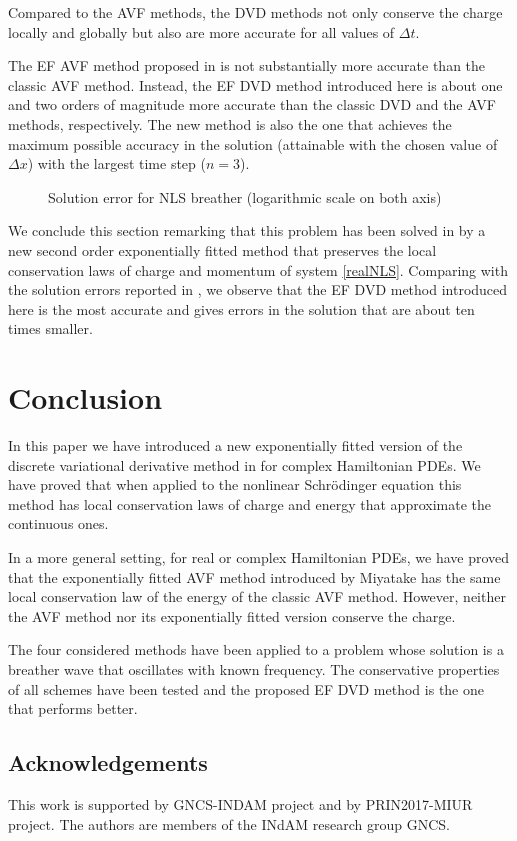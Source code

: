 \documentclass[twoside]{article}
\numberwithin{equation}{section}
\begin{document}
Compared to the AVF methods, the DVD methods not only conserve the charge locally and globally but also are more accurate for all values of $\Delta t$. 

The EF AVF method proposed in \cite{Miya} is not substantially more accurate than the classic AVF method. Instead, the EF DVD method introduced here is about one and two orders of magnitude more accurate than the classic DVD and the AVF methods, respectively. The new method is also the one that achieves the maximum possible accuracy in the solution (attainable with the chosen value of $\Delta x$) with the largest time step ($n=3$).

\begin{figure}[tbp]
\begin{center}
	
\end{center}
	\caption{Solution error for NLS breather (logarithmic scale on both axis)}
	\label{fig:NLSord}
\end{figure}

We conclude this section remarking that this problem has been solved in \cite{CFC} by a new second order exponentially fitted method that preserves the local conservation laws of charge and momentum of system \eqref{realNLS}. Comparing with the solution errors reported in \cite{CFC}, we observe that the EF DVD method introduced here is the most accurate and gives errors in the solution that are about ten times smaller.

\section{Conclusion}\label{concl}
In this paper we have introduced a new exponentially fitted version of the discrete variational derivative method in \cite{Matsuo} for complex Hamiltonian PDEs. We have proved that when applied to the nonlinear Schr\"odinger equation this method has local conservation laws of charge and energy that approximate the continuous ones. 

In a more general setting, for real or complex Hamiltonian PDEs, we have proved that the exponentially fitted AVF method introduced by Miyatake \cite{Miya} has the same local conservation law of the energy of the classic AVF method. However, neither the AVF method nor its exponentially fitted version conserve the charge. 

The four considered methods have been applied to a problem whose solution is a breather wave that oscillates with known frequency. The conservative properties of all schemes have been tested and the proposed EF DVD method is the one that performs better.

\subsection*{Acknowledgements} 
This work is supported by GNCS-INDAM project and by PRIN2017-MIUR project. The authors are members of the INdAM research group GNCS.


\end{document}
